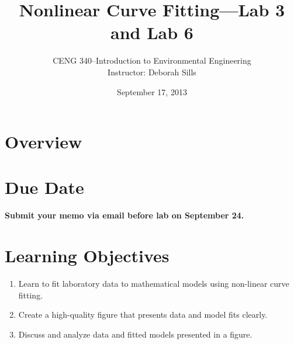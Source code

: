 \documentclass[12pt,letterpaper]{article}
\begin{document}
\setlength{\parindent}{0cm} 


\frenchspacing


\setlength{\topmargin}{-.5in}
\setlength{\textheight}{9in}
\setlength{\oddsidemargin}{.125in}
\setlength{\textwidth}{6.25in}




\title {Nonlinear Curve Fitting---Lab 3 and Lab 6} 
\author {CENG 340--Introduction to Environmental Engineering\\
Instructor: Deborah Sills}
\date {September 17, 2013}
\maketitle


\section*{Overview}




\section *{Due Date}
\textbf{ Submit your memo via email before lab on September 24.} 

\section *{Learning Objectives}
\begin{enumerate}
\item Learn to fit laboratory data to mathematical models using non-linear curve fitting.\
\item Create a high-quality figure that presents data and model fits clearly.\
\item Discuss and analyze data and fitted models presented in a figure.\ 
\end{enumerate}
\end{document}
